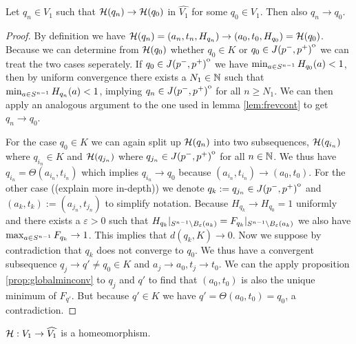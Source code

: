 \begin{lemma}
    Let $q_n \in V_1$ such that ${\mathcal{H}}(q_n)\to {\mathcal{H}}(q_0)$ in $\widehat{V_1}$ for some $q_0\in V_1$. Then also $q_n \to q_0$.
\end{lemma}
\begin{proof}
    By definition we have ${\mathcal{H}}(q_n) = (a_n,t_n,H_{q_n}) \to (a_0,t_0,H_{q_0}) = {\mathcal{H}}(q_0)$. Because we can determine from ${\mathcal{H}}(q_0)$ whether $q_0\in K$ or $q_0\in {\kern0ptJ(p^-,p^+)}^{\mathrm{o}}$ we can treat the two cases seperately. 
    If $q_0\in {\kern0ptJ(p^-,p^+)}^{\mathrm{o}}$ we have $\min_{a\in {S^{n-1}}} H_{q_0}(a) < 1$, then by uniform convergence there exists a $N_1\in \mathbb{N}$ such that $\min_{a\in {S^{n-1}}} H_{q_n}(a)<1$, implying $q_n\in {\kern0ptJ(p^-,p^+)}^{\mathrm{o}}$ for all $n \ge N_1$. We can then apply an analogous argument to the one used in lemma \ref{lem:frevcont} to get $q_n \to q_0$.

    For the case $q_0\in K$ we can again split up ${\mathcal{H}}(q_n)$ into two subsequences, ${\mathcal{H}}(q_{i_n})$ where $q_{i_n}\in K$ and ${\mathcal{H}}(q_{j_n})$ where $q_{j_n}\in {\kern0ptJ(p^-,p^+)}^{\mathrm{o}}$ for all $n\in \mathbb{N}$. We thus have $q_{i_n}=\Theta(a_{i_n},t_{i_n})$ which implies $q_{i_n}\to q_0$ because $(a_{i_n},t_{i_n}) \to (a_0,t_0)$. For the other case ((explain more in-depth)) we denote $q_k:=q_{j_n}\in {\kern0ptJ(p^-,p^+)}^{\mathrm{o}}$ and $(a_k,t_k):=(a_{j_n},t_{j_n})$ to simplify notation. Because $H_{q_k}\to H_{q_0}=1$ uniformly and there exists a $\varepsilon>0$ such that $H_{q_k}\rvert_{{S^{n-1}}\setminus B_\varepsilon(a_k)} = F_{q_k}\rvert_{{S^{n-1}}\setminus B_\varepsilon(a_k)}$ we also have $\max_{a\in {S^{n-1}}} F_{q_k}\to 1$. This implies that $d(q_k, K)\to 0$. Now we suppose by contradiction that $q_k$ does not converge to $q_0$. We thus have a convergent subsequence $q_j\to q'\neq q_0\in K$ and $a_j\to a_0, t_j\to t_0$. We can the apply proposition \ref{prop:globalminconv} to $q_j$ and $q'$ to find that $(a_0,t_0)$ is also the unique minimum of $F_{q'}$. But because $q'\in K$ we have $q' = \Theta(a_0,t_0) = q_0$, a contradiction.
\end{proof}

\begin{corollary}\label{cor:Hhomeo}
    ${\mathcal{H}}:V_1 \to \widehat{V_1}$ is a homeomorphism.
\end{corollary}

